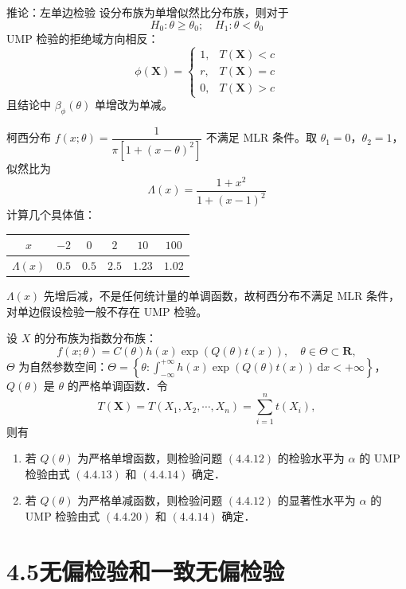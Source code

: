 \begin{theorem}{推论：左单边检验}{}
设分布族为单增似然比分布族，则对于
$$H_0: \theta \geq \theta_0; \quad H_1: \theta < \theta_0$$
UMP 检验的拒绝域方向相反：
$$\phi(\boldsymbol{X}) = \begin{cases} 1, & T(\boldsymbol{X}) < c \\ r, & T(\boldsymbol{X}) = c \\ 0, & T(\boldsymbol{X}) > c \end{cases}$$
且结论中 $\beta_\phi(\theta)$ 单增改为单减。
\end{theorem}
\begin{example}
柯西分布 $f(x;\theta) = \dfrac{1}{\pi[1+(x-\theta)^2]}$ 不满足 MLR 条件。取 $\theta_1 = 0$，$\theta_2 = 1$，似然比为
$$\Lambda(x) = \frac{1+x^2}{1+(x-1)^2}$$
计算几个具体值：
\begin{center}
\begin{center}
\begin{tabular}{cccccc}
\hline
$x$ & $-2$ & $0$ & $2$ & $10$ & $100$ \\
\hline
$\Lambda(x)$ & $0.5$ & $0.5$ & $2.5$ & $1.23$ & $1.02$ \\
\hline
\end{tabular}
\end{center}
\end{center}
$\Lambda(x)$ 先增后减，不是任何统计量的单调函数，故柯西分布不满足 MLR 条件，对单边假设检验一般不存在 UMP 检验。
\end{example}
\begin{corollary}[4.4.3]
设 $X$ 的分布族为指数分布族：
\[
f(x;\theta) = C(\theta)h(x)\exp(Q(\theta)t(x)), \quad \theta \in \Theta \subset \mathbf{R},
\]
$\Theta$ 为自然参数空间：$\Theta = \left\{\theta : \int_{-\infty}^{+\infty} h(x)\exp(Q(\theta)t(x))\,\mathrm{d}x < +\infty\right\}$，$Q(\theta)$ 是 $\theta$ 的严格单调函数．令
\[
T(\boldsymbol{X}) = T(X_1, X_2, \cdots, X_n) = \sum_{i=1}^{n} t(X_i),
\]
则有

\begin{enumerate}
    \item[(1)] 若 $Q(\theta)$ 为严格单增函数，则检验问题 $(4.4.12)$ 的检验水平为 $\alpha$ 的 UMP 检验由式 $(4.4.13)$ 和 $(4.4.14)$ 确定．
    \item[(2)] 若 $Q(\theta)$ 为严格单减函数，则检验问题 $(4.4.12)$ 的显著性水平为 $\alpha$ 的 UMP 检验由式 $(4.4.20)$ 和 $(4.4.14)$ 确定．
\end{enumerate}
\end{corollary}
\section{4.5无偏检验和一致无偏检验}
